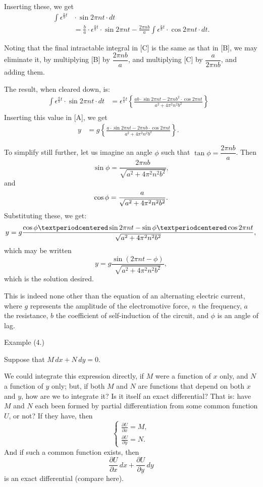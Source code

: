 \documentclass{ximera}
\begin{document}
Inserting these, we get
\begin{align*}
\int \epsilon^{\frac{a}{b} t} &{} · \sin 2 \pi n t · dt\\
&= \frac{b}{a} · \epsilon^{\frac{a}{b} t} · \sin 2 \pi n t -
   \frac{2 \pi n b}{a} \int \epsilon^{\frac{a}{b} t} · \cos 2 \pi n t · dt. \tag*{[C]}
\end{align*}

Noting that the final intractable integral in [C] is
the same as that in [B], we may eliminate it, by
multiplying [B] by $\dfrac{2 \pi nb}{a}$, and multiplying [C] by
$\dfrac{a}{2 \pi nb}$, and adding them.


The result, when cleared down, is:
\begin{align*}
\int \epsilon^{\frac{a}{b} t} · \sin 2 \pi n t · dt
  &= \epsilon^{\frac{a}{b} t} \left\{\frac{ ab · \sin 2 \pi nt - 2 \pi n b^2 · \cos 2 \pi n t}{ a^2 + 4 \pi^2 n^2 b^2 } \right\}
\tag*{[D]} &\\
\end{align*}
Inserting this value in [A], we get
\begin{align*}
y &= g \left\{\frac{ a · \sin 2 \pi n t - 2 \pi n b · \cos 2 \pi nt}{ a^2 + 4 \pi^2  n^2 b^2}\right\}. &
\end{align*}

To simplify still further, let us imagine an angle $\phi$
such that $\tan \phi = \dfrac{2 \pi n b}{ a}$.
   Then
\[
\sin \phi = \frac{2 \pi nb}{\sqrt{a^2 + 4 \pi^2 n^2 b^2}},
\]
 and
 \[
\cos \phi = \frac{a}{\sqrt{a^2 + 4 \pi^2 n^2 b^2}}.  \\
\]
Substituting these, we get:
 \[
y = g \frac{\cos \phi · \sin 2 \pi nt
  - \sin \phi · \cos 2 \pi nt}{\sqrt{a^2 + 4 \pi^2 n^2 b^2}}, \\
\]
which may be written
 \[
y = g \frac{\sin(2 \pi nt - \phi)}{\sqrt{a^2 + 4 \pi^2 n^2 b^2}},
\]
 which is the solution  desired.


This is indeed none other than the equation of an
alternating electric current, where $g$ represents the
amplitude of the electromotive force, $n$ the frequency,
$a$ the resistance, $b$ the coefficient of self-induction of
the circuit, and $\phi$ is an angle of lag.




Example (4.)


   Suppose that
$M\, dx + N\, dy = 0.$


We could integrate this expression directly, if $M$
were a function of $x$ only, and $N$ a function of $y$
only; but, if both $M$ and $N$ are functions that depend
on both $x$ and $y$, how are we to integrate it? Is it
itself an exact differential? That is: have $M$ and $N$
each been formed by partial differentiation from some
common function $U$, or not? If they have, then
\[\left\{
  \begin{aligned}
 \frac{\partial U}{\partial x} = M, \\
 \frac{\partial U}{\partial y} = N.
  \end{aligned}
\right.
\]
And if such a common function exists, then
\[
\frac{\partial U}{\partial x}\, dx + \frac{\partial U}{\partial y}\, dy
\]
is an exact differential (compare here).
\end{document}
